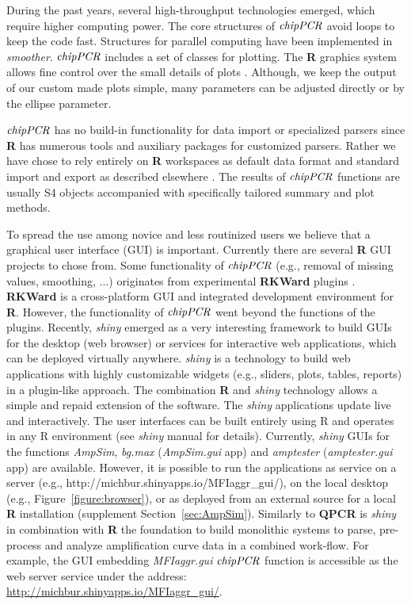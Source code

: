 \documentclass[twocolumn]{bmcart}%
\begin{document}
During the past years, several high-throughput technologies emerged, which 
require higher computing power. The core structures of $\emph{chipPCR}$ avoid 
loops to keep the code fast. Structures for parallel computing have been 
implemented in \textsl{smoother}. $\emph{chipPCR}$ includes a set of classes 
for plotting. The \textbf{R} graphics system allows fine control over the small 
details of plots \cite{Murrell_2012}. Although, we keep the output 
of our custom made plots simple, many parameters can be adjusted directly or by 
the ellipse parameter.

 $\emph{chipPCR}$ has no build-in functionality for data import or specialized 
parsers since \textbf{R} has numerous tools and auxiliary packages for customized 
parsers. Rather we have chose to rely entirely on \textbf{R} workspaces as 
default data format and standard import and export as described elsewhere 
\cite{RDCT2014c}. The results of $\emph{chipPCR}$ functions are usually S4 objects 
accompanied with specifically tailored summary and plot methods.

To spread the use among novice and less routinized users we believe that a 
graphical user interface (GUI) is important. Currently there are several 
\textbf{R} GUI projects \cite{Valero_2012} to chose from. Some functionality of 
$\emph{chipPCR}$ (e.g., removal of missing values, smoothing, ...) originates 
from experimental \textbf{RKWard} plugins \cite{roediger_bead_qPCR_2013, 
roediger_RKWard_2013}. \textbf{RKWard} \cite{rodiger_rkward_2012} is a 
cross-platform GUI and integrated development environment for \textbf{R}. 
However, the functionality of $\emph{chipPCR}$ went beyond the functions of the 
plugins. Recently, \emph{shiny} emerged as a very interesting framework to build 
GUIs for the desktop (web browser) or services for interactive web applications, 
which can be deployed virtually anywhere. \emph{shiny} is a technology to build 
web applications with highly customizable widgets (e.g., sliders, plots, tables, 
reports) in a plugin-like approach. The combination \textbf{R} and \emph{shiny} 
technology allows a simple and repaid extension of the software. The 
\emph{shiny} applications update live and interactively. The user interfaces can 
be built entirely using R and operates in any R environment (see \emph{shiny} 
manual for details). Currently, \emph{shiny} GUIs for the functions 
\textsl{AmpSim}, \textsl{bg.max} (\textsl{AmpSim.gui} app) and 
\textsl{amptester} (\textsl{amptester.gui} app) are available. However, it is 
possible to run the applications as service on a server (e.g., 
http://michbur.shinyapps.io/MFIaggr_gui/), on the local desktop (e.g., 
Figure~\ref{figure:browser}), or as deployed from an external source for a local 
\textbf{R} installation 
(supplement Section~\ref{sec:AmpSim}). Similarly to 
\textbf{QPCR} \cite{pabinger_2009} is \emph{shiny} in combination with 
\textbf{R} the foundation to build monolithic systems to parse, pre-process and 
analyze amplification curve data in a combined work-flow. For example, the GUI 
embedding \textsl{MFIaggr.gui} $\emph{chipPCR}$ function is accessible as the 
web server service under the address:
\url{http://michbur.shinyapps.io/MFIaggr_gui/}.
\end{document}
